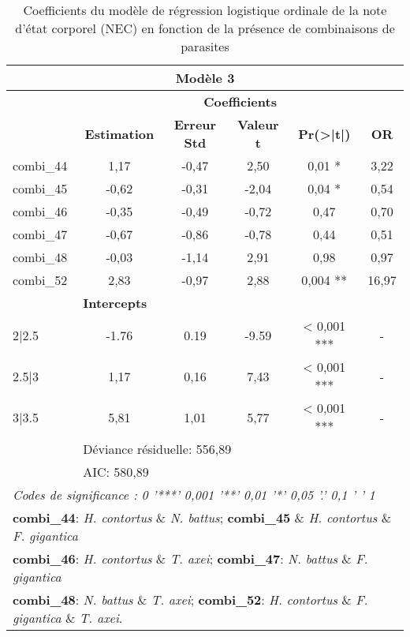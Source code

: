 \begin{table}[ht]
	\centering
	\caption{Coefficients du modèle de régression logistique ordinale de la note d'état corporel (NEC) en fonction de la présence de combinaisons de parasites
		\label{tab:model3}}
	\begin{tabular}{lccccc}
		\toprule
		\multicolumn{6}{c}{\textbf{Modèle 3}} \\
		\midrule
		& \multicolumn{5}{c}{\textbf{Coefficients}} \\
		\midrule
		& \textbf{Estimation} & \textbf{Erreur Std} & \textbf{Valeur t} & \textbf{Pr(>|t|)} & \textbf{OR}\\
		\midrule
		combi\_44 & 1,17 & -0,47 & 2,50 & 0,01 * & 3,22\\
		combi\_45 & -0,62 & -0,31 & -2,04 & 0,04 * & 0,54\\
		combi\_46 & -0,35 & -0,49 & -0,72 & 0,47 & 0,70\\
		combi\_47 & -0,67 & -0,86 & -0,78 & 0,44 & 0,51\\
		combi\_48 & -0,03 & -1,14 & 2,91 & 0,98 & 0,97\\
		combi\_52 & 2,83 & -0,97 & 2,88 & 0,004 ** & 16,97\\
		\midrule
		& \multicolumn{5}{l}{\textbf{Intercepts}}  \\
		2|2.5 & -1.76 & 0.19 & -9.59 & < 0,001 *** & -\\
		2.5|3 & 1,17 & 0,16 & 7,43 & < 0,001 *** & -\\
		3|3.5 & 5,81 & 1,01 & 5,77 & < 0,001 *** & -\\
		\midrule
		& \multicolumn{5}{l}{Déviance résiduelle: 556,89}\\
		& \multicolumn{5}{l}{AIC: 580,89}\\
		\midrule
		\multicolumn{6}{l}{\textit{Codes de significance : 0 '***' 0,001 '**' 0,01 '*' 0,05 '.' 0,1 ' ' 1}} \\
		\multicolumn{6}{l}{\textbf{combi\_44}: \textit{H. contortus} \& \textit{N. battus}; \textbf{combi\_45} \& \textit{H. contortus} \& \textit{F. gigantica}}\\
		\multicolumn{6}{l}{\textbf{combi\_46}: \textit{H. contortus} \& \textit{T. axei}; \textbf{combi\_47}: \textit{N. battus} \& \textit{F. gigantica}} \\
		\multicolumn{6}{l}{\textbf{combi\_48}: \textit{N. battus} \& \textit{T. axei}; \textbf{combi\_52}: \textit{H. contortus} \& \textit{F. gigantica} \& \textit{T. axei}.}\\
		\bottomrule
	\end{tabular}
\end{table}


